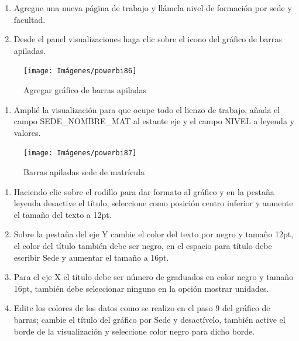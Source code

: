 \documentclass[
]{book}
\providecommand{\tightlist}{%
  \setlength{\itemsep}{0pt}\setlength{\parskip}{0pt}}
\begin{document}
\begin{enumerate}
\def\labelenumi{\arabic{enumi}.}
\item
  Agregue una nueva página de trabajo y llámela nivel de formación por sede y facultad.
\item
  Desde el panel visualizaciones haga clic sobre el icono del gráfico de barras apiladas.
\end{enumerate}

\begin{figure}

{\centering \texttt{[image: Imágenes/powerbi86]} 

}

\caption{Agregar gráfico de barras apiladas}\label{fig:paso2barrasapiladas-fig}
\end{figure}

\begin{enumerate}
\def\labelenumi{\arabic{enumi}.}
\setcounter{enumi}{2}
\tightlist
\item
  Amplié la visualización para que ocupe todo el lienzo de trabajo, añada el campo SEDE\_NOMBRE\_MAT al estante eje y el campo NIVEL a leyenda y valores.
\end{enumerate}

\begin{figure}

{\centering \texttt{[image: Imágenes/powerbi87]} 

}

\caption{Barras apiladas sede de matrícula}\label{fig:paso3barrasapiladas-fig}
\end{figure}

\begin{enumerate}
\def\labelenumi{\arabic{enumi}.}
\setcounter{enumi}{3}
\item
  Haciendo clic sobre el rodillo para dar formato al gráfico y en la pestaña leyenda desactive el título, seleccione como posición centro inferior y aumente el tamaño del texto a 12pt.
\item
  Sobre la pestaña del eje Y cambie el color del texto por negro y tamaño 12pt, el color del título también debe ser negro, en el espacio para título debe escribir Sede y aumentar el tamaño a 16pt.
\item
  Para el eje X el título debe ser número de graduados en color negro y tamaño 16pt, también debe seleccionar ninguno en la opción mostrar unidades.
\item
  Edite los colores de los datos como se realizo en el paso 9 del gráfico de barras; cambie el título del gráfico por Sede y desactívelo, también active el borde de la visualización y seleccione color negro para dicho borde.
\end{enumerate}
\end{document}

